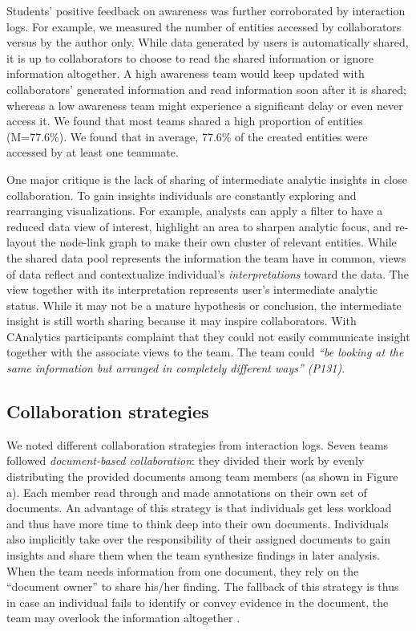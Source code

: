 

Students' positive feedback on awareness was further corroborated by
interaction logs. For example, we measured the number of entities
accessed by collaborators versus by the author only. While data
generated by users is automatically shared, it is up to collaborators to
choose to read the shared information or ignore information altogether.
A high awareness team would keep updated with collaborators' generated
information and read information soon after it is shared; whereas a low
awareness team might experience a significant delay or even never access
it. We found that most teams shared a high proportion of entities
(M=77.6\%). We found that in average, 77.6\% of the created entities
were accessed by at least one teammate.

One major critique is the lack of sharing of intermediate analytic
insights in close collaboration. To gain insights individuals are
constantly exploring and rearranging visualizations. For example,
analysts can apply a filter to have a reduced data view of interest,
highlight an area to sharpen analytic focus, and re-layout the node-link
graph to make their own cluster of relevant entities. While the shared
data pool represents the information the team have in common, views of
data reflect and contextualize individual's \emph{interpretations}
toward the data. The view together with its interpretation represents
user's intermediate analytic status. While it may not be a mature
hypothesis or conclusion, the intermediate insight is still worth
sharing because it may inspire collaborators. With CAnalytics
participants complaint that they could not easily communicate insight
together with the associate views to the team. The team could \emph{``be
looking at the same information but arranged in completely different
ways'' (P131)}.

\subsection{Collaboration strategies}\label{collaboration-strategies}

We noted different collaboration strategies from interaction logs. Seven
teams followed \emph{document-based collaboration}: they divided their
work by evenly distributing the provided documents among team members
(as shown in Figure \autocite{fig:labor_division}a). Each member read
through and made annotations on their own set of documents. An advantage
of this strategy is that individuals get less workload and thus have
more time to think deep into their own documents. Individuals also
implicitly take over the responsibility of their assigned documents to
gain insights and share them when the team synthesize findings in later
analysis. When the team needs information from one document, they rely
on the ``document owner'' to share his/her finding. The fallback of this
strategy is thus in case an individual fails to identify or convey
evidence in the document, the team may overlook the information
altogether \autocite{Borge2012}.


